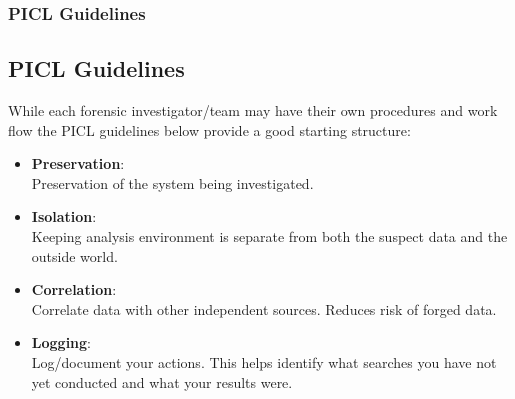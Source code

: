 \documentclass{beamer}
\begin{document}
\begin{frame}
	\frametitle{PICL Guidelines}
	\subsection*{PICL Guidelines}
	While each forensic investigator/team may have their own procedures and work flow the PICL guidelines below provide a good starting structure:\\
	\vspace{\baselineskip}
	\begin{itemize}
		\item \textbf{Preservation}:\\	 Preservation of the system being investigated.
		\item \textbf{Isolation}:\\	 Keeping analysis environment is separate from both the suspect data and the outside world.
		\item \textbf{Correlation}:\\	 Correlate data with other independent sources. Reduces risk of forged data.
		\item \textbf{Logging}:\\	 Log/document your actions. This helps identify what searches you have not yet conducted and what your results were.
	\end{itemize}
\end{frame}

%
\end{document}
